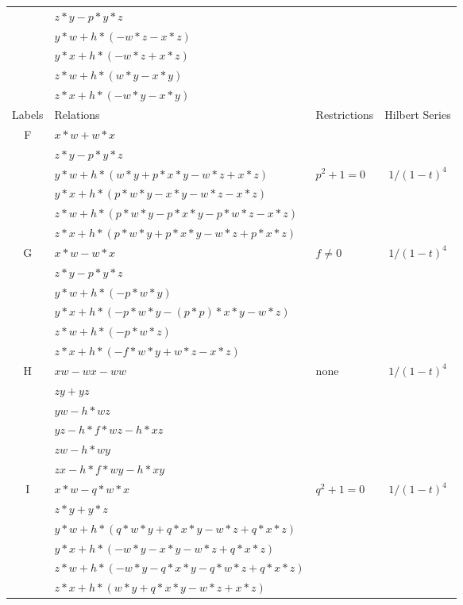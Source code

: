 \documentclass[12]{article}
\begin{document}
\begin{longtable}[c]{|c|p{5.75cm}|p{2.75cm}|c|}
    & $  z*y - p*y*z $ & &  \\ 
   & $ y*w + h*(-w*z - x*z ) $ & & \\  
   & $ y*x + h*(-w*z + x*z ) $ & & \\  
   & $ z*w + h*(w*y - x*y ) $ & & \\ 
   & $  z*x + h*(-w*y - x*y ) $ & &  \\  
\hline
\pagebreak
\midrule[1.0pt]
Labels & Relations & Restrictions & Hilbert Series \\
\hline
 F & $ x*w + w*x $ & & \\ 
    & $  z*y - p*y*z $ & &  \\  
   & $ y*w + h*(w*y + p*x*y - w*z + x*z) $ &  $ p^2+1=0 $ & $ 1/(1-t)^4 $ \\  
   & $  y*x + h*(p*w*y - x*y - w*z - x*z ) $ & & \\  
   & $ z*w + h*(p*w*y - p*x*y - p*w*z - x*z) $ & & \\ 
   & $ z*x + h*(p*w*y + p*x*y - w*z + p*x*z) $ & &  \\  
\hline
 G & $ x*w - w*x $ &\multirow{6}{*}{ $ f \neq 0 $ } &\multirow{6}{*}{$ 1/(1-t)^4 $} \\ 
    & $ z*y - p*y*z $ & &  \\ 
   & $ y*w + h*(-p*w*y) $ & & \\  
   & $ y*x + h*(-p*w*y - (p*p)*x*y - w*z) $ & & \\  
   & $ z*w + h*(-p*w*z) $ & & \\ 
   & $ z*x + h*(-f*w*y + w*z - x*z ) $ & &  \\  
\hline
 H & $ xw - wx - ww $ &\multirow{6}{*}{none} &\multirow{6}{*}{$ 1/(1-t)^4 $} \\ 
    & $ zy + yz $ & &  \\ 
   & $ yw - h*wz $ & & \\  
   & $ yz - h*f*wz - h*xz $ & & \\  
   & $ zw - h*wy $ & & \\ 
   & $ zx - h*f*wy-h*xy $ & &  \\  
\hline
 I & $ x*w - q*w*x $ &\multirow{6}{*}{$ q^2 + 1 = 0 $} &\multirow{6}{*}{$ 1/(1-t)^4 $} \\ 
    & $ z*y + y*z $ & &  \\ 
   & $ y*w + h*(q*w*y + q*x*y - w*z + q*x*z ) $ & & \\  
   & $ y*x + h*(-w*y - x*y - w*z + q*x*z ) $ & & \\  
   & $  z*w + h*( -w*y - q*x*y - q*w*z + q*x*z ) $ & & \\ 
   & $ z*x + h*(w*y + q*x*y - w*z + x*z ) $ & &  \\  

\end{longtable}
\end{document}
